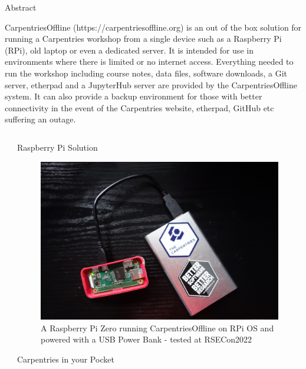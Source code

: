 \documentclass[final]{beamer}
\newlength{\sepwidth}
\newlength{\colwidth}
\newcommand{\separatorcolumn}{\begin{column}{\sepwidth}\end{column}}
\begin{document}
	\begin{frame}[t]
		\begin{block}{\large Abstract}	

			CarpentriesOffline (https://carpentriesoffline.org) is an out of the box solution for running a Carpentries workshop from a single device such as a Raspberry Pi (RPi), old laptop or even a dedicated server. It is intended for use in environments where there is limited or no internet access. Everything needed to run the workshop including course notes, data files, software downloads, a Git server, etherpad and a JupyterHub server are provided by the CarpentriesOffline system. It can also provide a backup environment for those with better connectivity in the event of the Carpentries website, etherpad, GitHub etc suffering an outage.
		\end{block}
	
		\begin{columns}[t]
			\separatorcolumn
			
			
			\begin{column}{\colwidth}
				
				\begin{block}{Raspberry Pi Solution}
					\begin{center}
						\begin{figure}
							\includegraphics[width=0.6\columnwidth]{logos/CarpentriesOfflinePhoto.png}
							\caption{A Raspberry Pi Zero running CarpentriesOffline on RPi OS and powered with a USB Power Bank - tested at RSECon2022}
						\end{figure}
					\end{center}

					
				\end{block}
				
				\begin{alertblock}{Carpentries in your Pocket}
					

\end{alertblock}
\end{column}
\end{columns}
\end{frame}
\end{document}
